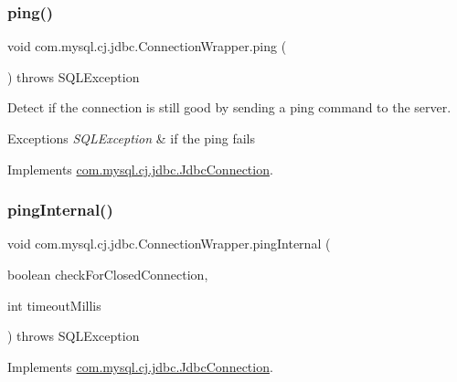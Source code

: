 \subsubsection{\texorpdfstring{ping()}{ping()}}
{\footnotesize\ttfamily void com.\+mysql.\+cj.\+jdbc.\+Connection\+Wrapper.\+ping (\begin{DoxyParamCaption}{ }\end{DoxyParamCaption}) throws S\+Q\+L\+Exception}

Detect if the connection is still good by sending a ping command to the server.


\begin{DoxyExceptions}{Exceptions}
{\em S\+Q\+L\+Exception} & if the ping fails \\
\hline
\end{DoxyExceptions}


Implements \mbox{\hyperlink{interfacecom_1_1mysql_1_1cj_1_1jdbc_1_1_jdbc_connection_a6d078258f83ddc438d64bafb0f665004}{com.\+mysql.\+cj.\+jdbc.\+Jdbc\+Connection}}.

\mbox{\label{classcom_1_1mysql_1_1cj_1_1jdbc_1_1_connection_wrapper_a352f4c8ac35df8c04b0cbbe68173b71e}} 
\subsubsection{\texorpdfstring{ping\+Internal()}{pingInternal()}}
{\footnotesize\ttfamily void com.\+mysql.\+cj.\+jdbc.\+Connection\+Wrapper.\+ping\+Internal (\begin{DoxyParamCaption}\item[{boolean}]{check\+For\+Closed\+Connection,  }\item[{int}]{timeout\+Millis }\end{DoxyParamCaption}) throws S\+Q\+L\+Exception}



Implements \mbox{\hyperlink{interfacecom_1_1mysql_1_1cj_1_1jdbc_1_1_jdbc_connection_a25615f355be83a136df2efcde168666c}{com.\+mysql.\+cj.\+jdbc.\+Jdbc\+Connection}}.

\mbox{\label{classcom_1_1mysql_1_1cj_1_1jdbc_1_1_connection_wrapper_ab2c7f6bc0a7b9b072867f639c85c5ea7}} 
